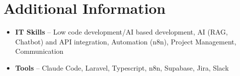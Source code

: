 \documentclass[a4paper,10pt]{article}
\begin{document}
\section{Additional Information}
\begin{itemize}
\item \textbf{IT Skills} -- Low code development/AI based development, AI (RAG, Chatbot) and API integration, Automation (n8n), Project Management, Communication
\item \textbf{Tools} -- Claude Code, Laravel, Typescript, n8n, Supabase, Jira, Slack
\end{itemize}
\end{document}
